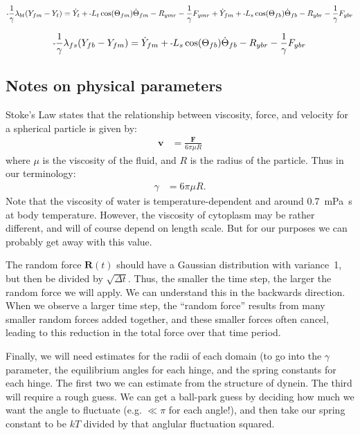 \documentclass[11pt, landscape]{article}
\newcommand{\mn}{\scalebox{0.7}[1.0]{-}}
\begin{document}
\begin{equation}
\mn\frac{1}{\gamma}\lambda_{bt}(Y_{fm} - Y_{t }) =
\dot{Y}_{t } + \mn L_{t}\cos(\Theta_{fm})\dot{\Theta}_{fm} - R_{ymr} - \frac{1}{\gamma}F_{ymr} + \dot{Y}_{fm} + \mn L_{s}\cos(\Theta_{fb})\dot{\Theta}_{fb}
- R_{ybr} - \frac{1}{\gamma}F_{ybr}
\label{eq:Cy}
\end{equation}%

\begin{equation}
\mn\frac{1}{\gamma}\lambda_{fs}(Y_{fb} - Y_{fm}) = \dot{Y}_{fm} + \mn L_{s}\cos(\Theta_{fb})\dot{\Theta}_{fb} - R_{ybr} - \frac{1}{\gamma}F_{ybr}
\label{eq:Dy}
\end{equation}%

\begin{twocolumn}
\section{Notes on physical parameters}

Stoke's Law states that the relationship between viscosity, force, and
velocity for a spherical particle is given by:
\begin{align}
  \mathbf{v} &= \frac{\mathbf{F}}{6\pi \mu R}
\end{align}
where $\mu$ is the viscosity of the fluid, and $R$ is the radius of
the particle.  Thus in our terminology:
\begin{align}
  \gamma &= 6\pi \mu R.
\end{align}
Note that the viscosity of water is temperature-dependent and around
0.7~mPa~s at body temperature.  However, the viscosity of cytoplasm
may be rather different, and will of course depend on length scale.
But for our purposes we can probably get away with this value.

The random force $\mathbf{R}(t)$ should have a Gaussian distribution
with variance~1, but then be divided by $\sqrt{\Delta t}$.  Thus, the
smaller the time step, the larger the random force we will apply.  We
can understand this in the backwards direction.  When we observe a
larger time step, the ``random force'' results from many smaller
random forces added together, and these smaller forces often cancel,
leading to this reduction in the total force over that time period.

Finally, we will need estimates for the radii of each domain (to go
into the $\gamma$ parameter, the equilibrium angles for each hinge, and
the spring constants for each hinge.  The first two we can estimate
from the structure of dynein.  The third will require a rough guess.
We can get a ball-park guess by deciding how much we want the angle to
fluctuate (e.g. $\ll \pi$ for each angle!), and then take our spring
constant to be $kT$ divided by that anglular fluctuation squared.

\end{twocolumn}
\end{document}
